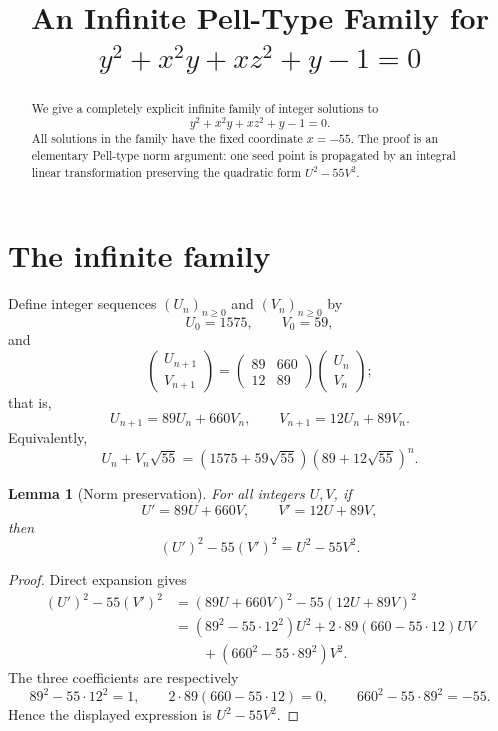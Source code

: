 \documentclass[11pt]{article}
\title{An Infinite Pell-Type Family for\texorpdfstring{\\[2mm]
$y^2+x^2y+xz^2+y-1=0$}{ y2+x2y+xz2+y-1=0}}
\author{}
\date{}
\newtheorem{lemma}{Lemma}
\theoremstyle{remark}
\begin{document}
\maketitle
\vspace{-2.5em}

\begin{abstract}
We give a completely explicit infinite family of integer solutions to
\[
 y^2+x^2y+xz^2+y-1=0.
\]
All solutions in the family have the fixed coordinate $x=-55$.  The proof is an elementary Pell-type norm argument: one seed point is propagated by an integral linear transformation preserving the quadratic form $U^2-55V^2$.
\end{abstract}

\section{The infinite family}

Define integer sequences $(U_n)_{n\geq 0}$ and $(V_n)_{n\geq 0}$ by
\begin{equation}\label{eq:recurrence}
 U_0=1575,\qquad V_0=59,
\end{equation}
and
\begin{equation}\label{eq:recurrence-step}
 \begin{pmatrix}U_{n+1}\\ V_{n+1}\end{pmatrix}
 =
 \begin{pmatrix}89&660\\12&89\end{pmatrix}
 \begin{pmatrix}U_n\\V_n\end{pmatrix};
\end{equation}
that is,
\[
 U_{n+1}=89U_n+660V_n,
 \qquad
 V_{n+1}=12U_n+89V_n.
\]
Equivalently,
\begin{equation}\label{eq:closed-form}
 U_n+V_n\sqrt{55}
 =(1575+59\sqrt{55})(89+12\sqrt{55})^n.
\end{equation}

\begin{lemma}[Norm preservation]\label{lem:norm}
For all integers $U,V$, if
\[
 U'=89U+660V,
 \qquad
 V'=12U+89V,
\]
then
\[
 (U')^2-55(V')^2=U^2-55V^2.
\]
\end{lemma}

\begin{proof}
Direct expansion gives
\begin{align*}
 (U')^2-55(V')^2
 &=(89U+660V)^2-55(12U+89V)^2\\
 &=(89^2-55\cdot12^2)U^2
   +2\cdot89(660-55\cdot12)UV\\
 &\qquad +(660^2-55\cdot89^2)V^2.
\end{align*}
The three coefficients are respectively
\[
 89^2-55\cdot12^2=1,
 \qquad
 2\cdot89(660-55\cdot12)=0,
 \qquad
 660^2-55\cdot89^2=-55.
\]
Hence the displayed expression is $U^2-55V^2$.
\end{proof}
\end{document}
